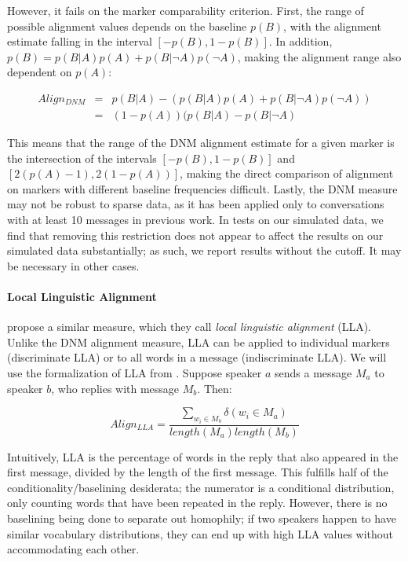 \documentclass{acm_proc_article-sp}
\begin{document}
However, it fails on the marker comparability criterion.  First, the range of possible alignment values depends on the baseline $p(B)$, with the alignment estimate falling in the interval $[-p(B),1-p(B)]$.  In addition, $p(B) = p(B|A)p(A) + p(B|\neg A)p(\neg A)$, making the alignment range also dependent on $p(A)$:

\begin{align*}
Align_{DNM} & = & p(B|A) - (p(B|A)p(A) + p(B|\neg A)p(\neg A)) \\
& = & (1-p(A))(p(B|A) - p(B|\neg A)
\end{align*} 

This means that the range of the DNM alignment estimate for a given marker is the intersection of the intervals $[-p(B), 1-p(B)]$ and $[2(p(A)-1), 2(1-p(A))]$, making the direct comparison of alignment on markers with different baseline frequencies difficult.  Lastly, the DNM measure may not be robust to sparse data, as it has been applied only to conversations with at least 10 messages in previous work.  In tests on our simulated data, we find that removing this restriction does not appear to affect the results on our simulated data substantially; as such, we report results without the cutoff. It may be necessary in other cases.

\paragraph{Local Linguistic Alignment} \cite{FusaroliEtAl2012} propose a similar measure, which they call \textit{local linguistic alignment} (LLA).  Unlike the DNM alignment measure, LLA can be applied to individual markers (discriminate LLA) or to all words in a message (indiscriminate LLA).  We will use the formalization of LLA from \cite{WangReitterYen2014}.  Suppose speaker $a$ sends a message $M_a$ to speaker $b$, who replies with message $M_b$. Then:

\begin{equation}
Align_{LLA} = \frac{\sum_{w_i \in M_b} \delta(w_i \in M_a)}{length(M_a)length(M_b)}
\end{equation}

Intuitively, LLA is the percentage of words in the reply that also appeared in the first message, divided by the length of the first message.  This fulfills half of the conditionality/baselining desiderata; the numerator is a conditional distribution, only counting words that have been repeated in the reply.  However, there is no baselining being done to separate out homophily; if two speakers happen to have similar vocabulary distributions, they can end up with high LLA values without accommodating each other.
\end{document}
